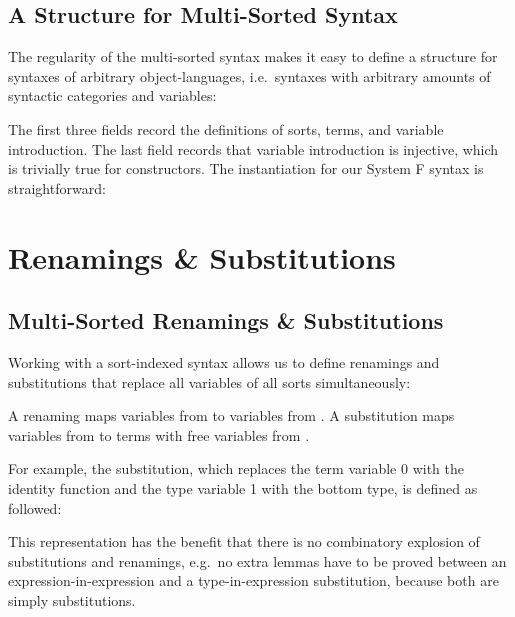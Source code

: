\documentclass[sigplan,10pt, anonymous]{acmart}
\newenvironment{LibCode*}{%
  \begin{tcolorbox}[%
    colframe=white,%
    boxrule=0.0pt,%
    top=2.5pt,%
    left=2.5pt,%
    bottom=2.5pt,%
    right=2.5pt,%
    boxsep=0pt%
  ]\vspace{-0.2\baselineskip}%
}{%
  \vspace{-1\baselineskip}%
  \end{tcolorbox}%
}
\newenvironment{ExampleCode*}{%
  \begin{tcolorbox}[%
    colframe=white,%
    colback=yellow!5,%
    boxrule=0.0pt,%
    top=2.5pt,%
    left=2.5pt,%
    bottom=2.5pt,%
    right=2.5pt,%
    boxsep=0pt%
  ]\vspace{-0.2\baselineskip}%
}{%
  \vspace{-1\baselineskip}%
  \end{tcolorbox}%
}
\newcommand*\LibCode[1]{\begin{LibCode*}{#1}\end{LibCode*}}
\newcommand*\AppCode[1]{{#1}}
\newcommand*\ExampleCode[1]{\begin{ExampleCode*}{#1}\end{ExampleCode*}}
\newcommand*\ACode[1]{\AgdaFontStyle{\textcolor{mygray}{#1}}}
\newcommand*\AField[1]{\AgdaField{#1}}
\newcommand*\ACon[1]{\AgdaInductiveConstructor{#1}}
\newcommand*\ADef[1]{\AgdaFunction{#1}}
\begin{document}

  \subsection{A Structure for Multi-Sorted Syntax}
  \label{sec:syntax:structure}
  The regularity of the multi-sorted syntax makes it easy to define a
  structure for syntaxes of arbitrary object-languages, i.e.\ syntaxes
  with arbitrary amounts of syntactic categories and variables:
  \LibCode\KSyntax
  The first three fields record the definitions of sorts, terms, and variable introduction.
  The last field records that variable introduction
  \ACode{\AField{`\_}} is injective, which is trivially true for
  constructors. The instantiation for our System F syntax is
  straightforward:
  \AppCode\FSyntaxInst

  \section{Renamings \& Substitutions}
  \label{sec:maps}
  \subsection{Multi-Sorted Renamings \& Substitutions}
  \label{sec:maps:example}
  Working with a sort-indexed syntax allows us to define renamings and substitutions
  that replace all variables of all sorts simultaneously:

  \ExampleCode\FExampleSubRen

  A renaming \ACode{S₁ \ADef{→ᵣ} S₂} maps variables from \ACode{S₁} to
  variables from \ACode{S₂}.
  A substitution \ACode{S₁ \ADef{→ₛ} S₂} maps variables from \ACode{S₁} to
  terms with free variables from \ACode{S₂}.

  For example, the substitution, which replaces the term variable 0 with the
  identity function and the type variable 1 with the bottom type, is defined
  as followed:
  \ExampleCode\FExampleSub

  This representation has the benefit that there is no combinatory
  explosion of substitutions and renamings, e.g.\ no extra lemmas have to be
  proved between an expression-in-expression and a type-in-expression
  substitution, because both are simply substitutions.
\end{document}
